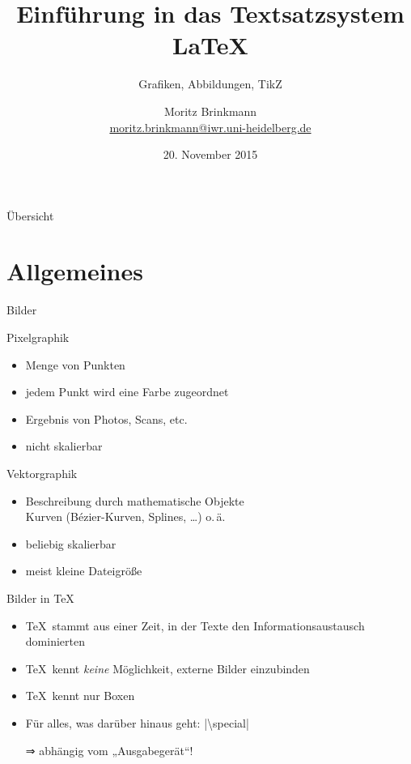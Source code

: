 \documentclass{beamer}
\title{Einführung in das Textsatzsystem \LaTeX{}}
\subtitle{Grafiken, Abbildungen, TikZ}
\author[Mo]{Moritz Brinkmann\\\url{moritz.brinkmann@iwr.uni-heidelberg.de}}
\date{20. November 2015}
\begin{document}
\MakeShortVerb{|}

\frame{\titlepage}

\begin{frame}{Übersicht}
	\tableofcontents
\end{frame}


\section{Allgemeines}
\begin{frame}{Bilder}
	\begin{block}{Pixelgraphik}
		\begin{itemize}
			\item Menge von Punkten
			\item jedem Punkt wird eine Farbe zugeordnet
			\item Ergebnis von Photos, Scans, etc. 
			\item nicht skalierbar
		\end{itemize}
	\end{block}
	\begin{block}{Vektorgraphik}
		\begin{itemize}
			\item Beschreibung durch mathematische Objekte
			\\ Kurven (Bézier-Kurven, Splines, …) o.\,ä.
			\item beliebig skalierbar
			\item meist kleine Dateigröße
		\end{itemize}
	\end{block}
\end{frame}

\begin{frame}{Bilder in \TeX}
	\begin{itemize}
		\item \TeX\ stammt aus einer Zeit, in der Texte den Informationsaustausch dominierten
		\item \TeX\ kennt \emph{keine} Möglichkeit, externe Bilder einzubinden
		\item \TeX\ kennt nur Boxen
		\item Für alles, was darüber hinaus geht: |\textbackslash special|
		\item[⇒] abhängig vom „Ausgabegerät“!
	\end{itemize}
\end{frame}
\end{document}
